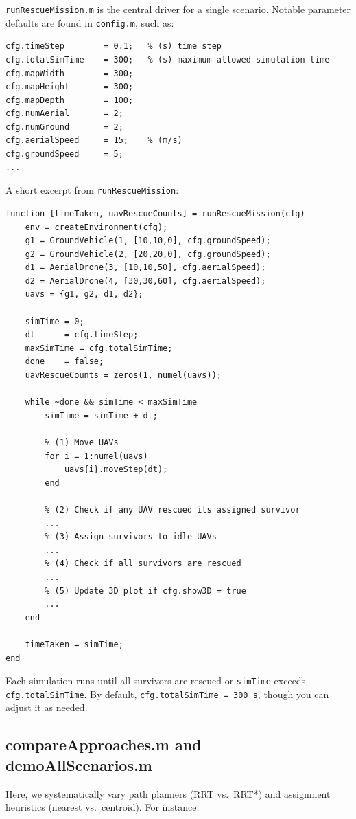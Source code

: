\documentclass[12pt,a4paper]{report}
\begin{document}
\texttt{runRescueMission.m} is the central driver for a single scenario. Notable parameter 
defaults are found in \texttt{config.m}, such as:
\begin{verbatim}
cfg.timeStep        = 0.1;   % (s) time step
cfg.totalSimTime    = 300;   % (s) maximum allowed simulation time
cfg.mapWidth        = 300;
cfg.mapHeight       = 300;
cfg.mapDepth        = 100;
cfg.numAerial       = 2;
cfg.numGround       = 2;
cfg.aerialSpeed     = 15;    % (m/s)
cfg.groundSpeed     = 5;
...
\end{verbatim}
A short excerpt from \texttt{runRescueMission}:
\begin{verbatim}
function [timeTaken, uavRescueCounts] = runRescueMission(cfg)
    env = createEnvironment(cfg);
    g1 = GroundVehicle(1, [10,10,0], cfg.groundSpeed);
    g2 = GroundVehicle(2, [20,20,0], cfg.groundSpeed);
    d1 = AerialDrone(3, [10,10,50], cfg.aerialSpeed);
    d2 = AerialDrone(4, [30,30,60], cfg.aerialSpeed);
    uavs = {g1, g2, d1, d2};

    simTime = 0;
    dt      = cfg.timeStep;
    maxSimTime = cfg.totalSimTime;
    done    = false;
    uavRescueCounts = zeros(1, numel(uavs));

    while ~done && simTime < maxSimTime
        simTime = simTime + dt;

        % (1) Move UAVs
        for i = 1:numel(uavs)
            uavs{i}.moveStep(dt);
        end

        % (2) Check if any UAV rescued its assigned survivor
        ...
        % (3) Assign survivors to idle UAVs
        ...
        % (4) Check if all survivors are rescued
        ...
        % (5) Update 3D plot if cfg.show3D = true
        ...
    end

    timeTaken = simTime;
end
\end{verbatim}
Each simulation runs until all survivors are rescued or \texttt{simTime} 
exceeds \texttt{cfg.totalSimTime}. By default, \texttt{cfg.totalSimTime = 300\,s}, 
though you can adjust it as needed.

\subsection{compareApproaches.m and demoAllScenarios.m}
Here, we systematically vary path planners (RRT vs.\ RRT*) and assignment heuristics 
(nearest vs.\ centroid). For instance:
\end{document}
